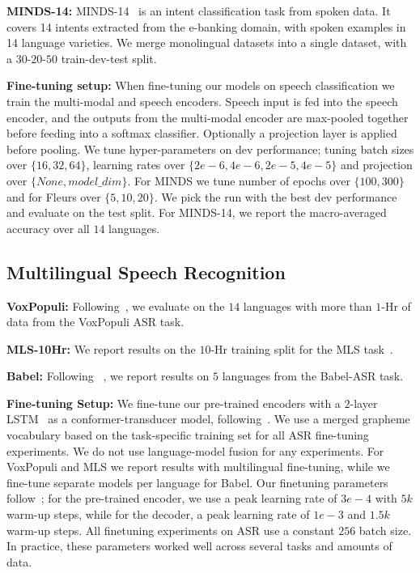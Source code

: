 \documentclass[nohyperref]{article}
\begin{document}
\textbf{MINDS-14:} MINDS-14~\cite{gerz2021multilingual} is an intent classification task from spoken data. It covers 14 intents extracted from the e-banking domain, with spoken examples in 14 language varieties. We merge monolingual datasets into a  single dataset, with a $30$-$20$-$50$ train-dev-test split. 

\textbf{Fine-tuning setup:} When fine-tuning our models on speech classification we train the multi-modal and speech encoders. Speech input is fed into the speech encoder, and the outputs from the multi-modal encoder are max-pooled together before feeding into a softmax classifier. Optionally a projection layer is applied before pooling. We tune hyper-parameters on dev performance; tuning batch sizes over $\{16, 32, 64\}$, learning rates over $\{2e-6, 4e-6, 2e-5, 4e-5\}$ and projection over $\{None, model\_dim\}$. For MINDS we tune number of epochs over $\{100, 300\}$ and for Fleurs over $\{5, 10, 20\}$. We pick the run with the best dev performance and evaluate on the test split. For MINDS-14, we report the macro-averaged accuracy over all $14$ languages.

\subsection{Multilingual Speech Recognition}
\label{subsec:tasks-asr}
\textbf{VoxPopuli:} Following~\citet{wang2021voxpopuli}, we evaluate on the $14$ languages with more than $1$-Hr of data from the VoxPopuli ASR task.

\textbf{MLS-10Hr:} We report results on the $10$-Hr training split for the MLS task~\citep{pratap2020mls}.

\textbf{Babel:} Following ~\citet{babu2021xls}, we report results on $5$ languages from the Babel-ASR task.

\textbf{Fine-tuning Setup:} We fine-tune our pre-trained encoders with a $2$-layer LSTM~\cite{hochreiter1997long} as a conformer-transducer model, following~\citet{chung2021w2v}. We use a merged grapheme vocabulary based on the task-specific training set for all ASR fine-tuning experiments. We do not use language-model fusion for any experiments. For VoxPopuli and MLS we report results with multilingual fine-tuning, while we fine-tune separate models per language for Babel. Our finetuning parameters follow~\cite{zhang2020pushing}; for the pre-trained encoder, we use a peak learning rate of $3e-4$ with $5k$ warm-up steps, while for the decoder, a peak learning rate of $1e-3$ and $1.5k$ warm-up steps. All finetuning experiments on ASR use a constant $256$ batch size. In practice, these parameters worked well across several tasks and amounts of data.
\end{document}
